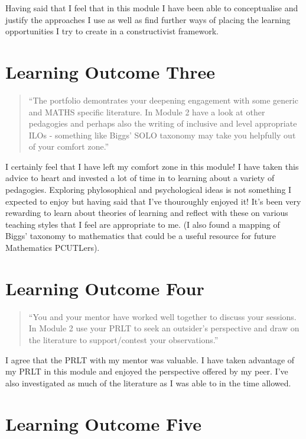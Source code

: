 \documentclass[a4paper,12pt]{article}
\begin{document}
Having said that I feel that in this module I have been able to conceptualise and justify the approaches I use as well as find further ways of placing the learning opportunities I try to create in a constructivist framework.

\section{Learning Outcome Three}

\begin{quote}
    ``The portfolio demontrates your deepening engagement with some generic and MATHS specific literature. In Module 2 have a look at other pedagogies and perhaps also the writing of inclusive and level appropriate ILOs - something like Biggs' SOLO taxonomy may take you helpfully out of your comfort zone.''
\end{quote}

I certainly feel that I have left my comfort zone in this module! I have taken this advice to heart and invested a lot of time in to learning about a variety of pedagogies. Exploring phylosophical and psychological ideas is not something I expected to enjoy but having said that I've thouroughly enjoyed it! It's been very rewarding to learn about theories of learning and reflect with these on various teaching styles that I feel are appropriate to me. (I also found a mapping of Biggs' taxonomy to mathematics that could be a useful resource for future Mathematics PCUTLers).

\section{Learning Outcome Four}

\begin{quote}
    ``You and your mentor have worked well together to discuss your sessions. In Module 2 use your PRLT to seek an outsider's perspective and draw on the literature to support/contest your observations.''
\end{quote}

I agree that the PRLT with my mentor was valuable. I have taken advantage of my PRLT in this module and enjoyed the perspective offered by my peer. I've also investigated as much of the literature as I was able to in the time allowed.

\section{Learning Outcome Five}
\end{document}
